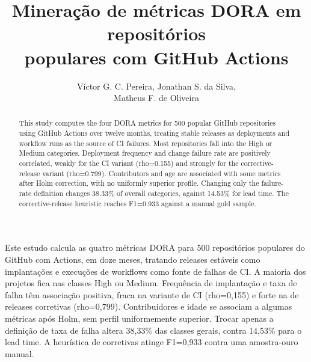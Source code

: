 \documentclass[12pt]{article}
\title{Mineração de métricas DORA em repositórios\\ populares com GitHub Actions}
\author{Víctor G. C. Pereira\inst{1}, Jonathan S. da Silva\inst{1},\\
Matheus F. de Oliveira\inst{1}}
\begin{document}
\maketitle
\begin{abstract}
This study computes the four DORA metrics for 500 popular GitHub repositories
using GitHub Actions over twelve months, treating stable releases as
deployments and workflow runs as the source of CI failures. Most repositories
fall into the High or Medium categories. Deployment frequency and change
failure rate are positively correlated, weakly for the CI variant
(rho=0.155) and strongly for the corrective-release variant (rho=0.799).
Contributors and age are associated with some metrics after Holm correction,
with no uniformly superior profile. Changing only the failure-rate definition
changes 38.33\% of overall categories, against 14.53\% for lead time. The
corrective-release heuristic reaches F1=0.933 against a manual gold sample.
\end{abstract}
\begin{resumo}
Este estudo calcula as quatro métricas DORA para 500 repositórios populares do
GitHub com Actions, em doze meses, tratando releases estáveis como implantações
e execuções de workflows como fonte de falhas de CI. A maioria dos projetos
fica nas classes High ou Medium. Frequência de implantação e taxa de falha têm
associação positiva, fraca na variante de CI (rho=0,155) e forte na de
releases corretivas (rho=0,799). Contribuidores e idade se associam a algumas
métricas após Holm, sem perfil uniformemente superior. Trocar apenas a
definição de taxa de falha altera 38,33\% das classes gerais, contra 14,53\%
para o lead time. A heurística de corretivas atinge F1=0,933 contra uma
amostra-ouro manual.
\end{resumo}








\end{document}
